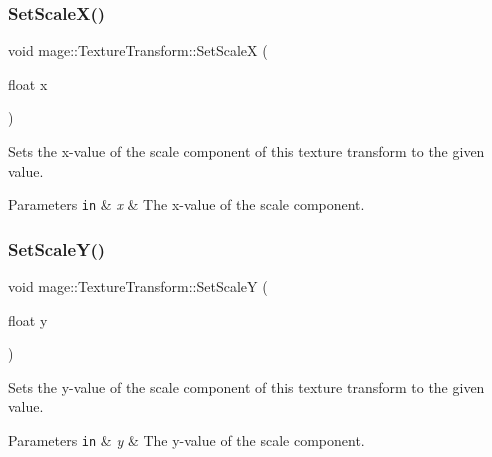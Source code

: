 \subsubsection{\texorpdfstring{Set\+Scale\+X()}{SetScaleX()}}
{\footnotesize\ttfamily void mage\+::\+Texture\+Transform\+::\+Set\+ScaleX (\begin{DoxyParamCaption}\item[{float}]{x }\end{DoxyParamCaption})\hspace{0.3cm}{\ttfamily [noexcept]}}

Sets the x-\/value of the scale component of this texture transform to the given value.


\begin{DoxyParams}[1]{Parameters}
\mbox{\tt in}  & {\em x} & The x-\/value of the scale component. \\
\hline
\end{DoxyParams}
\hypertarget{structmage_1_1_texture_transform_adab76da125263a34b406f0fd1eaa298a}{}\label{structmage_1_1_texture_transform_adab76da125263a34b406f0fd1eaa298a} 
\subsubsection{\texorpdfstring{Set\+Scale\+Y()}{SetScaleY()}}
{\footnotesize\ttfamily void mage\+::\+Texture\+Transform\+::\+Set\+ScaleY (\begin{DoxyParamCaption}\item[{float}]{y }\end{DoxyParamCaption})\hspace{0.3cm}{\ttfamily [noexcept]}}

Sets the y-\/value of the scale component of this texture transform to the given value.


\begin{DoxyParams}[1]{Parameters}
\mbox{\tt in}  & {\em y} & The y-\/value of the scale component. \\
\hline
\end{DoxyParams}
\hypertarget{structmage_1_1_texture_transform_a2d7d69662b4d36be31afa92c21055a36}{}\label{structmage_1_1_texture_transform_a2d7d69662b4d36be31afa92c21055a36} 
